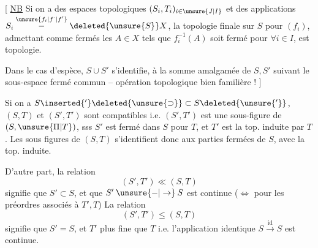 [ \uline{NB} Si on a des espaces topologiques $(S_i,T_i)_{i\in\unsure{J|I}}$ et des applications $S_i\overset{\unsure{f_i|f^{\cdot}|f'}}{\mathbin{-}}\deleted{\unsure{S}}X$, la topologie finale sur $S$ pour $(f_i)$, admettant comme fermés les $A\in X$ tels que $f_i^{-1}(A)$ soit fermé pour $\forall i\in I$, est  topologie.


Dans le cas d'espèce, $S\cup S'$ s'identifie, à la somme amalgamée de $S,S'$ suivant le sous-espace fermé commun -- opération topologique bien familière ! ]

Si on a $S\inserted{'}\deleted{\unsure{\supset}}\subset S\deleted{\unsure{'}}$, $(S,T)$ et $(S',T')$ sont compatibles i.e. $(S',T')$ est une sous-figure de $(S,\unsure{\Pi|T})$, sss $S'$ est fermé dans $S$ pour $T$, et $T'$ est la top. induite par $T$. Les sous figures de $(S,T)$ s'identifient donc aux parties fermées de $S$, avec la top. induite.

D'autre part, la relation
\[
 (S',T')\ll(S,T)
\]
signifie que $S'\subset S$, et que $S'\mathbin{\unsure{-|\to}}S$ est continue ($\Longleftrightarrow$  pour les préordres associés à $T',T$) La relation
\[
  (S',T')\leq(S,T)
\]
signifie que $S'=S$, et $T'$ plus fine que $T$ i.e. l'application identique $S\xrightarrow{\mathrm{id}}S$ est continue.

